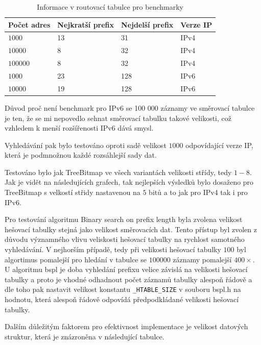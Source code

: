 \begin{table}[!htb]
	\center
	\label{tab:lpm-input}
	\caption{Informace v routovací tabulce pro benchmarky}
    \begin{tabular}{|l|l|l|l|}
    \hline
    Počet adres & Nejkratší prefix & Nejdelší prefix & Verze IP \\ \hline
    $1000$ & 13 & 31 & IPv4 \\ \hline
    $10000$ & 8 & 32 & IPv4 \\ \hline
    $100000$ & 8 & 32 & IPv4 \\ \hline
    $1000$ & 23 & 128 & IPv6 \\ \hline
    $10000$ & 19 & 128 & IPv6 \\ \hline
    \end{tabular}
\end{table}

Důvod proč není benchmark pro IPv6 se 100 000 záznamy ve směrovací tabulce je ten, že se mi nepovedlo
sehnat směrovací tabulku takové velikosti, což vzhledem k menší rozšířenosti IPv6 dává smysl.

Vyhledávání pak bylo testováno oproti sadě velikost $1000$ odpovídající verze IP, která je podmnožnou každé
rozsáhlejší sady dat.

Testováno bylo jak TreeBitmap ve všech variantách velikosti střídy, tedy $1-8$.
Jak je vidět na následujících grafech, tak nejlepších výsledků bylo dosaženo pro TreeBitmap s velkostí
střidy nastavenou na $5$ bitů a to jak pro IPv4 tak i pro IPv6.

Pro testování algoritmu Binary search on prefix length byla zvolena velikost hešovací tabulky
stejná jako velikost směrovacích dat. Tento přístup byl zvolen z důvodu významného vlivu
veliskosti hešovací tabulky na rychlost samotného vyhledávání. V nejhorším případě, tedy při
velikosti hešovací tabulky $100$ byl algortimus pomalejší pro hledání v tabulce se $100 000$ záznamy pomalejší
$400\times$.
U algoritmu bspl je doba vyhledání prefixu velice závislá na velikosti hešovací tabulky a proto je vhodné odhadnout počet záznamů tabulky alespoň řádově a dle toho pak nastavit velikost konstantu {\tt \_HTABLE\_SIZE} v souboru bspl.h na hodnotu, která alespoň řádově odpovídá předpodkládané velikosti hešovací tabulky.

Dalším důležitým faktorem pro efektivnost implementace je velikost datových struktur, která je znázroněna v následující tabulce.

